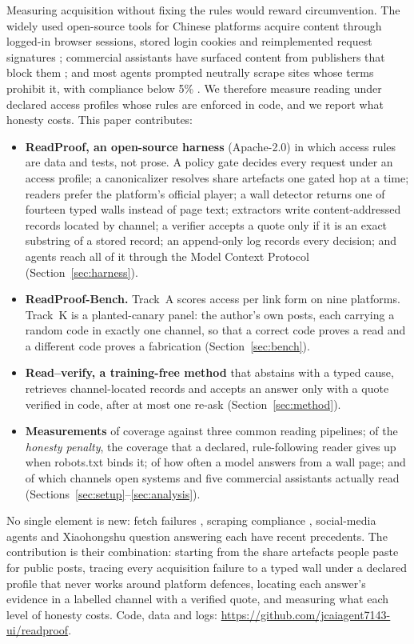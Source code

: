 \documentclass[11pt]{article}
\newcommand{\RepoURL}{\url{https://github.com/jcaiagent7143-ui/readproof}}
\begin{document}
Measuring acquisition without fixing the rules would reward circumvention. The widely used open-source
tools for Chinese platforms acquire content through logged-in browser sessions, stored login cookies and
reimplemented request signatures \citep{nanmicoder2026mediacrawler,xpzouying2026xhsmcp,evil0ctal2026douyinapi};
commercial assistants have surfaced content from publishers that block them
\citep{jazwinska2025tow,cloudflare2025perplexity}; and most agents prompted neutrally scrape sites whose
terms prohibit it, with compliance below 5\% \citep{imperial2026scrapebench}. We therefore measure reading
under declared access profiles whose rules are enforced in code, and we report what honesty costs. This
paper contributes:
\begin{itemize}[leftmargin=1.4em]
\item \textbf{ReadProof, an open-source harness} (Apache-2.0) in which access rules are data and tests, not
  prose. A policy gate decides every request under an access profile; a canonicalizer resolves share
  artefacts one gated hop at a time; readers prefer the platform's official player; a wall detector returns
  one of fourteen typed walls instead of page text; extractors write content-addressed records located by
  channel; a verifier accepts a quote only if it is an exact substring of a stored record; an append-only
  log records every decision; and agents reach all of it through the Model Context Protocol
  (Section~\ref{sec:harness}).
\item \textbf{ReadProof-Bench.} Track~A scores access per link form on nine platforms. Track~K is a planted-canary
  panel: the author's own posts, each carrying a random code in exactly one channel, so that a correct code proves a
  read and a different code proves a fabrication (Section~\ref{sec:bench}).
\item \textbf{Read--verify, a training-free method} that abstains with a typed cause, retrieves
  channel-located records and accepts an answer only with a quote verified in code, after at most one re-ask
  (Section~\ref{sec:method}).
\item \textbf{Measurements} of coverage against three common reading pipelines; of the \emph{honesty penalty}, the
  coverage that a declared, rule-following reader gives up when robots.txt binds it; of how often a model answers
  from a wall page; and of which channels open systems and five commercial assistants actually read
  (Sections~\ref{sec:setup}--\ref{sec:analysis}).
\end{itemize}
No single element is new: fetch failures \citep{zhang2026silent}, scraping compliance
\citep{imperial2026scrapebench}, social-media agents \citep{xue2026some} and Xiaohongshu question answering
\citep{jiang2026notevqa} each have recent precedents. The contribution is their combination: starting from
the share artefacts people paste for public posts, tracing every acquisition failure to a typed wall under a
declared profile that never works around platform defences, locating each answer's evidence in a labelled
channel with a verified quote, and measuring what each level of honesty costs.
Code, data and logs: \RepoURL.
\end{document}
